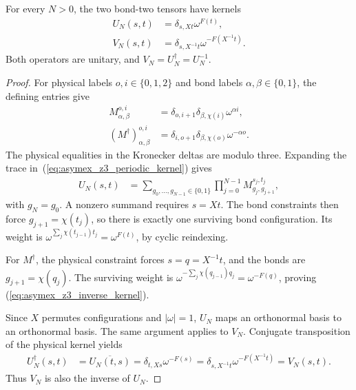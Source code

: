 \begin{lemma}
    \label{thm:asymex_z3_physical_kernels}
    \leanok

    For every $N>0$, the two bond-two tensors have kernels
    \begin{align}
        U_N(s,t) & =\delta_{s,Xt}\omega^{F(t)},             \\
        V_N(s,t) & =\delta_{s,X^{-1}t}\omega^{-F(X^{-1}t)}.
        \label{eq:asymex_z3_inverse_kernel}
    \end{align}
    Both operators are unitary, and $V_N=U_N^\dagger=U_N^{-1}$.
\end{lemma}

\begin{proof}
    \leanok
    For physical labels $o,i\in\{0,1,2\}$ and bond labels
    $\alpha,\beta\in\{0,1\}$, the defining entries give
    \begin{align}
        M^{o,i}_{\alpha,\beta}
         & =\delta_{o,i+1}\delta_{\beta,\chi(i)}\omega^{\alpha i},  \\
        (M^\dagger)^{o,i}_{\alpha,\beta}
         & =\delta_{i,o+1}\delta_{\beta,\chi(o)}\omega^{-\alpha o}.
        \label{eq:asymex_z3_local_entries}
    \end{align}
    The physical equalities in the Kronecker deltas are modulo three.
    Expanding the trace in~(\ref{eq:asymex_z3_periodic_kernel}) gives
    \begin{align}
        U_N(s,t)
         & =\sum_{g_0,\ldots,g_{N-1}\in\{0,1\}}
        \prod_{j=0}^{N-1}M^{s_j,t_j}_{g_j,g_{j+1}},
        \label{eq:asymex_z3_cyclic_trace}
    \end{align}
    with $g_N=g_0$. A nonzero summand requires $s=Xt$.
    The bond constraints then force $g_{j+1}=\chi(t_j)$, so there is
    exactly one surviving bond configuration. Its weight is
    $\omega^{\sum_j\chi(t_{j-1})t_j}=\omega^{F(t)}$, by cyclic
    reindexing.

    For $M^\dagger$, the physical constraint forces $s=q=X^{-1}t$,
    and the bonds are $g_{j+1}=\chi(q_j)$. The surviving weight is
    $\omega^{-\sum_j\chi(q_{j-1})q_j}=\omega^{-F(q)}$, proving
    (\ref{eq:asymex_z3_inverse_kernel}).

    Since $X$ permutes configurations and $|\omega|=1$, $U_N$ maps an
    orthonormal basis to an orthonormal basis. The same argument applies
    to $V_N$. Conjugate transposition of the physical kernel yields
    \begin{align}
        U_N^\dagger(s,t)
         & =\overline{U_N(t,s)}
        =\delta_{t,Xs}\omega^{-F(s)}
        =\delta_{s,X^{-1}t}\omega^{-F(X^{-1}t)}
        =V_N(s,t).
    \end{align}
    Thus $V_N$ is also the inverse of $U_N$.
\end{proof}

